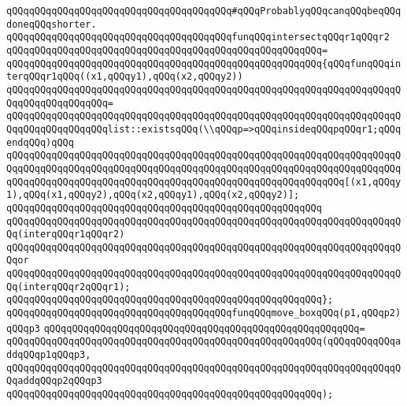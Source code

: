 \verb|qQQqqQQqqQQqqQQqqQQqqQQqqQQqqQQqqQQqqQQq#qQQqProbablyqQQqcanqQQqbeqQQqdoneqQQqshorter.|\newline
\newline
\verb|qQQqqQQqqQQqqQQqqQQqqQQqqQQqqQQqqQQqqQQqfunqQQqintersectqQQqr1qQQqr2|\newline
\verb|qQQqqQQqqQQqqQQqqQQqqQQqqQQqqQQqqQQqqQQqqQQqqQQqqQQqqQQq=|\newline
\verb|qQQqqQQqqQQqqQQqqQQqqQQqqQQqqQQqqQQqqQQqqQQqqQQqqQQqqQQq{qQQqfunqQQqinterqQQqr1qQQq((x1,qQQqy1),qQQq(x2,qQQqy2))|\newline
\verb|qQQqqQQqqQQqqQQqqQQqqQQqqQQqqQQqqQQqqQQqqQQqqQQqqQQqqQQqqQQqqQQqqQQqqQQqqQQqqQQqqQQqqQQq=|\newline
\verb|qQQqqQQqqQQqqQQqqQQqqQQqqQQqqQQqqQQqqQQqqQQqqQQqqQQqqQQqqQQqqQQqqQQqqQQqqQQqqQQqqQQqqQQqlist::existsqQQq(\\qQQqp=>qQQqinsideqQQqpqQQqr1;qQQqendqQQq)qQQq|\newline
\verb|qQQqqQQqqQQqqQQqqQQqqQQqqQQqqQQqqQQqqQQqqQQqqQQqqQQqqQQqqQQqqQQqqQQqqQQqqQQqqQQqqQQqqQQqqQQqqQQqqQQqqQQqqQQqqQQqqQQqqQQqqQQqqQQqqQQqqQQqqQQqqQQqqQQqqQQqqQQqqQQqqQQqqQQqqQQqqQQqqQQqqQQqqQQqqQQqqQQqqQQq[(x1,qQQqy1),qQQq(x1,qQQqy2),qQQq(x2,qQQqy1),qQQq(x2,qQQqy2)];|\newline
\verb|qQQqqQQqqQQqqQQqqQQqqQQqqQQqqQQqqQQqqQQqqQQqqQQqqQQqqQQq|\newline
\verb|qQQqqQQqqQQqqQQqqQQqqQQqqQQqqQQqqQQqqQQqqQQqqQQqqQQqqQQqqQQqqQQqqQQqqQQq(interqQQqr1qQQqr2)|\newline
\verb|qQQqqQQqqQQqqQQqqQQqqQQqqQQqqQQqqQQqqQQqqQQqqQQqqQQqqQQqqQQqqQQqqQQqqQQqor|\newline
\verb|qQQqqQQqqQQqqQQqqQQqqQQqqQQqqQQqqQQqqQQqqQQqqQQqqQQqqQQqqQQqqQQqqQQqqQQq(interqQQqr2qQQqr1);|\newline
\verb|qQQqqQQqqQQqqQQqqQQqqQQqqQQqqQQqqQQqqQQqqQQqqQQqqQQqqQQq};|\newline
\newline
\newline
\verb|qQQqqQQqqQQqqQQqqQQqqQQqqQQqqQQqqQQqqQQqfunqQQqmove_boxqQQq(p1,qQQqp2)qQQqp3|\newline
\verb|qQQqqQQqqQQqqQQqqQQqqQQqqQQqqQQqqQQqqQQqqQQqqQQqqQQqqQQq=|\newline
\verb|qQQqqQQqqQQqqQQqqQQqqQQqqQQqqQQqqQQqqQQqqQQqqQQqqQQqqQQq(qQQqqQQqqQQqaddqQQqp1qQQqp3,|\newline
\verb|qQQqqQQqqQQqqQQqqQQqqQQqqQQqqQQqqQQqqQQqqQQqqQQqqQQqqQQqqQQqqQQqqQQqqQQqaddqQQqp2qQQqp3|\newline
\verb|qQQqqQQqqQQqqQQqqQQqqQQqqQQqqQQqqQQqqQQqqQQqqQQqqQQqqQQq);|\newline
